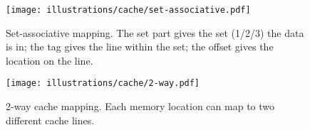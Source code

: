 \begin{figure}[htbp]
  \centering
  \texttt{[image: illustrations/cache/set-associative.pdf]}
  \caption{Set-associative mapping. The set part gives the set (1/2/3) the data is in; the tag gives the line within the set; the offset gives the location on the line.}
  \label{fig:set-associative}
\end{figure}

\begin{figure}[htbp]
  \centering
  \texttt{[image: illustrations/cache/2-way.pdf]}
  \caption{2-way cache mapping. Each memory location can map to two different cache lines.}
  \label{fig:label}
\end{figure}




